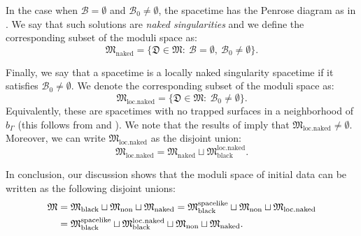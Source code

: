 \documentclass[11pt]{article}
\numberwithin{equation}{section}
\begin{document}
In the case when $\mathcal{B}=\emptyset$ and $\mathcal{B}_0\neq\emptyset$, the spacetime has the Penrose diagram as in . We say that such solutions are \textit{naked singularities} and we define the corresponding subset of the moduli space as:
\begin{equation}\label{M naked}
    \mathfrak{M}_{\mathrm{naked}}=\big\{\mathfrak{D}\in\mathfrak{M}:\ \mathcal{B}=\emptyset,\ \mathcal{B}_0\neq\emptyset\big\}.
\end{equation}

Finally, we say that a spacetime is a locally naked singularity spacetime if it satisfies $\mathcal{B}_0\neq\emptyset.$ We denote the corresponding subset of the moduli space as:
\begin{equation}\label{M locally naked}
    \mathfrak{M}_{\mathrm{loc.naked}}=\big\{\mathfrak{D}\in\mathfrak{M}:\ \mathcal{B}_0\neq\emptyset\big\}.
\end{equation}
Equivalently, these are spacetimes with no trapped surfaces in a neighborhood of $b_{\Gamma}$ (this follows from  and ). We note that the results of \cite{preparation} imply that $\mathfrak{M}_{\mathrm{loc.naked}}\neq\emptyset.$ Moreover, we can write $\mathfrak{M}_{\mathrm{loc.naked}}$ as the disjoint union:
\begin{equation}\label{M null in M locally naked}
    \mathfrak{M}_{\mathrm{loc.naked}}=\mathfrak{M}_{\mathrm{naked}}\sqcup\mathfrak{M}_{\mathrm{black}}^{\mathrm{loc.naked}}.
\end{equation}

In conclusion, our discussion shows that the moduli space of initial data can be written as the following disjoint unions:
\begin{align}\label{decomposition of M}
    \mathfrak{M}&=\mathfrak{M}_{\mathrm{black}}\sqcup\mathfrak{M}_{\mathrm{non}}\sqcup\mathfrak{M}_{\mathrm{naked}}=\mathfrak{M}_{\mathrm{black}}^{\mathrm{spacelike}}\sqcup\mathfrak{M}_{\mathrm{non}}\sqcup\mathfrak{M}_{\mathrm{loc.naked}}\\
    &=\mathfrak{M}_{\mathrm{black}}^{\mathrm{spacelike}}\sqcup\mathfrak{M}_{\mathrm{black}}^{\mathrm{loc.naked}}\sqcup\mathfrak{M}_{\mathrm{non}}\sqcup\mathfrak{M}_{\mathrm{naked}}.\notag
\end{align}
\end{document}
